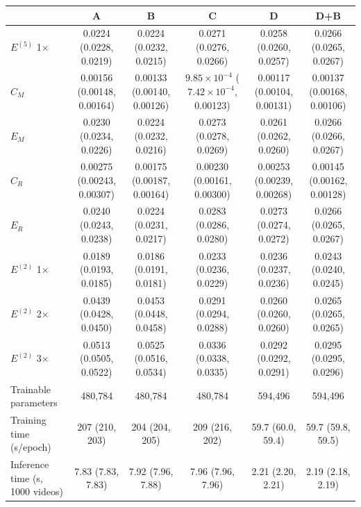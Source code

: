 \begin{tabular}{lccccc}
\toprule
 & A & B & C & D & D+B \\
\midrule
$E^{(5)}$ 1$\times$ & 0.0224 (0.0228, 0.0219) & 0.0224 (0.0232, 0.0215) & 0.0271 (0.0276, 0.0266) & 0.0258 (0.0260, 0.0257) & 0.0266 (0.0265, 0.0267) \\
$C_M$ & 0.00156 (0.00148, 0.00164) & 0.00133 (0.00140, 0.00126) & $9.85\times10^{-4}$ ($7.42\times10^{-4}$, 0.00123) & 0.00117 (0.00104, 0.00131) & 0.00137 (0.00168, 0.00106) \\
$E_M$ & 0.0230 (0.0234, 0.0226) & 0.0224 (0.0232, 0.0216) & 0.0273 (0.0278, 0.0269) & 0.0261 (0.0262, 0.0260) & 0.0266 (0.0266, 0.0267) \\
$C_R$ & 0.00275 (0.00243, 0.00307) & 0.00175 (0.00187, 0.00164) & 0.00230 (0.00161, 0.00300) & 0.00253 (0.00239, 0.00268) & 0.00145 (0.00162, 0.00128) \\
$E_R$ & 0.0240 (0.0243, 0.0238) & 0.0224 (0.0231, 0.0217) & 0.0283 (0.0286, 0.0280) & 0.0273 (0.0274, 0.0272) & 0.0266 (0.0265, 0.0267) \\
$E^{(2)}$ 1$\times$ & 0.0189 (0.0193, 0.0185) & 0.0186 (0.0191, 0.0181) & 0.0233 (0.0236, 0.0229) & 0.0236 (0.0237, 0.0236) & 0.0243 (0.0240, 0.0245) \\
$E^{(2)}$ 2$\times$ & 0.0439 (0.0428, 0.0450) & 0.0453 (0.0448, 0.0458) & 0.0291 (0.0294, 0.0288) & 0.0260 (0.0260, 0.0260) & 0.0265 (0.0265, 0.0265) \\
$E^{(2)}$ 3$\times$ & 0.0513 (0.0505, 0.0522) & 0.0525 (0.0516, 0.0534) & 0.0336 (0.0338, 0.0335) & 0.0292 (0.0292, 0.0291) & 0.0295 (0.0295, 0.0296) \\
Trainable parameters & 480,784 & 480,784 & 480,784 & 594,496 & 594,496 \\
Training time (s/epoch) & 207 (210, 203) & 204 (204, 205) & 209 (216, 202) & 59.7 (60.0, 59.4) & 59.7 (59.8, 59.5) \\
Inference time (s, 1000 videos) & 7.83 (7.83, 7.83) & 7.92 (7.96, 7.88) & 7.96 (7.96, 7.96) & 2.21 (2.20, 2.21) & 2.19 (2.18, 2.19) \\
\bottomrule
\end{tabular}

